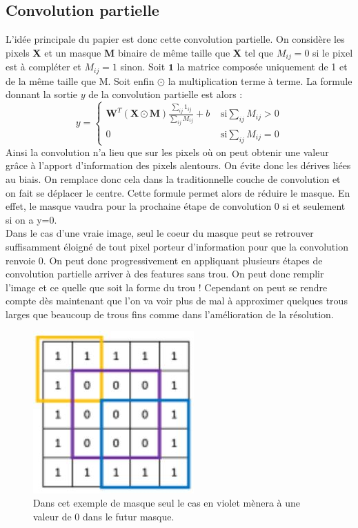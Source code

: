 \subsection{Convolution partielle}
L'idée principale du papier est donc cette convolution partielle. 
On considère les pixels \textbf{X} et un masque \textbf{M} binaire de même taille que \textbf{X} tel que $M_{ij} = 0$ si le pixel est à compléter et $M_{ij} = 1$ sinon. Soit $\textbf{1}$ la matrice composée uniquement de 1 et de la même taille que M. Soit enfin $\odot$ la multiplication terme à terme.
La formule donnant la sortie $y$ de la convolution partielle est alors :
\begin{equation}
    y = \left\{ \begin{array}{ll}
        \textbf{W}^T (\textbf{X} \odot \textbf{M} ) \frac{\sum_{ij} 1_{ij}}{\sum_{ij} M_{ij}}+ b & \mbox{ si} \sum_{ij} M_{ij} > 0 \\
        0 & \mbox{ si} \sum_{ij} M_{ij} = 0
        \end{array}
        \right.
\end{equation}
Ainsi la convolution n'a lieu que sur les pixels où on peut obtenir une valeur grâce à l'apport d'information des pixels alentours. On évite donc les dérives liées au biais. On remplace donc cela dans la traditionnelle couche de convolution et on fait se déplacer le centre. Cette formule permet alors de réduire le masque. En effet, le masque vaudra pour la prochaine étape de convolution 0 si et seulement si on a y=0.\\
Dans le cas d'une vraie image, seul le coeur du masque peut se retrouver suffisamment éloigné de tout pixel porteur d'information pour que la convolution renvoie 0. On peut donc progressivement en appliquant plusieurs étapes de convolution partielle arriver à des features sans trou. On peut donc remplir l'image et ce quelle que soit la forme du trou ! Cependant on peut se rendre compte dès maintenant que l'on va voir plus de mal à approximer quelques trous larges que beaucoup de trous fins comme dans l'amélioration de la résolution.

\begin{figure}[!h]
    \centering
    \includegraphics{"images/Image_inpainting/val0masque"}
    \caption{Dans cet exemple de masque seul le cas en violet mènera à une valeur de 0 dans le futur masque.}
\end{figure}


